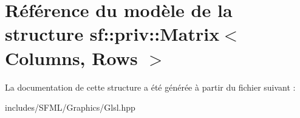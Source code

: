 \hypertarget{structsf_1_1priv_1_1Matrix}{}\section{Référence du modèle de la structure sf\+:\+:priv\+:\+:Matrix$<$ Columns, Rows $>$}
\label{structsf_1_1priv_1_1Matrix}


La documentation de cette structure a été générée à partir du fichier suivant \+:\begin{DoxyCompactItemize}
\item 
includes/\+S\+F\+M\+L/\+Graphics/Glsl.\+hpp\end{DoxyCompactItemize}
